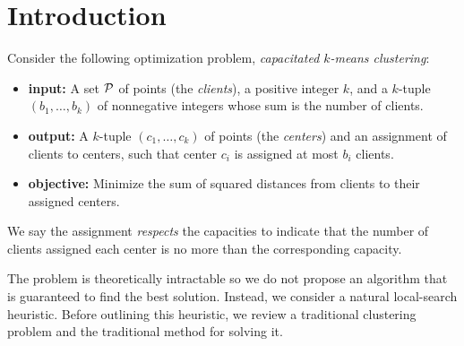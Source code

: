 \section{Introduction}

Consider the following optimization problem, {\em capacitated $k$-means
  clustering}:
\begin{itemize}
\item {\bf input:} A set $\cal P$ of points (the
{\em clients}), a positive integer $k$, and a $k$-tuple
$(b_1, \ldots, b_k)$ of nonnegative integers whose sum is the number
of clients.
\item {\bf output:} A $k$-tuple $(c_1, \ldots, c_k)$ of points
(the {\em centers}) and an assignment of clients to centers, such that
center $c_i$ is assigned at most $b_i$ clients.
\item {\bf objective:} Minimize the sum of squared
distances from clients to their assigned centers.
\end{itemize}
We say the assignment {\em respects} the capacities to indicate that
the number of clients assigned each center is no more than the
corresponding capacity.

The problem is theoretically intractable so
we do not propose an algorithm that is guaranteed to find the best
solution.  Instead, we consider a natural local-search heuristic.
Before outlining this heuristic, we review a traditional clustering
problem and the traditional method for solving it.

